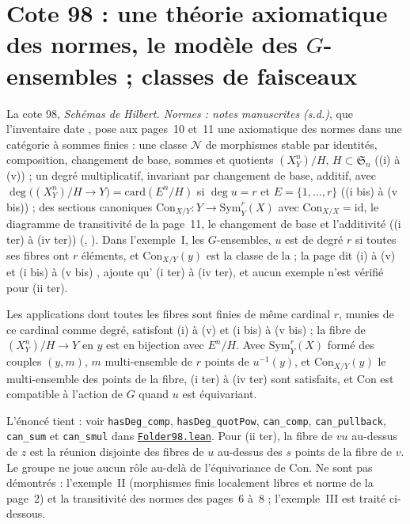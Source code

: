 \section[Cote 98 : une théorie axiomatique des normes, le modèle des G-ensembles ; classes de faisceaux]{Cote 98 : une théorie axiomatique des normes, le modèle des $G$-ensembles ; classes de faisceaux\protect{}}\label{sec:98}

La cote 98, \emph{Schémas de Hilbert. Normes : notes manuscrites (s.d.)}, que l'inventaire date \q{[à partir de 1966-1967]}, pose aux pages~10 et~11 une axiomatique des normes dans une catégorie à sommes finies : une classe $\mathcal N$ de morphismes stable par identités, composition, changement de base, sommes et quotients $(X^n_Y)/H$, $H \subset \mathfrak S_n$ ((i) à (v)) ; un degré multiplicatif, invariant par changement de base, additif, avec $\deg\bigl((X^n_Y)/H \to Y\bigr) = \mathrm{card}(E^n/H)$ si $\deg u = r$ et $E = \{1, \ldots, r\}$ ((i bis) à (v bis)) ; des sections canoniques $\mathrm{Con}_{X/Y} : Y \to \mathrm{Sym}^r_Y(X)$ avec $\mathrm{Con}_{X/X} = \mathrm{id}$, le diagramme de transitivité de la page~11, le changement de base et l'additivité ((i ter) à (iv ter)) (, ). Dans l'exemple~I, les $G$-ensembles, $u$ est de degré $r$ si toutes ses fibres ont $r$ éléments, et $\mathrm{Con}_{X/Y}(y)$ est la classe de la  ; la page dit (i) à (v) et (i bis) à (v bis) , ajoute qu' (i ter) à (iv ter), et aucun exemple n'est vérifié pour (ii ter).

\begin{encadre}
\begin{theoreme}
Les applications dont toutes les fibres sont finies de même cardinal $r$, munies de ce cardinal comme degré, satisfont (i) à (v) et (i bis) à (v bis) ; la fibre de $(X^n_Y)/H \to Y$ en $y$ est en bijection avec $E^n/H$. Avec $\mathrm{Sym}^r_Y(X)$ formé des couples $(y, m)$, $m$ multi-ensemble de $r$ points de $u^{-1}(y)$, et $\mathrm{Con}_{X/Y}(y)$ le multi-ensemble des points de la fibre, (i ter) à (iv ter) sont satisfaits, et $\mathrm{Con}$ est compatible à l'action de $G$ quand $u$ est équivariant.
\end{theoreme}
\end{encadre}

\noindent L'énoncé tient : voir \texttt{hasDeg\_comp}, \texttt{hasDeg\_quotPow}, \texttt{can\_comp}, \texttt{can\_pullback}, \texttt{can\_sum} et \texttt{can\_smul} dans \href{\leanblob/CategoryTheory/Folder98.lean}{\texttt{Folder98.\allowbreak{}lean}}. Pour (ii ter), la fibre de $vu$ au-dessus de $z$ est la réunion disjointe des fibres de $u$ au-dessus des $s$ points de la fibre de $v$. Le groupe ne joue aucun rôle au-delà de l'équivariance de $\mathrm{Con}$. Ne sont pas démontrés : l'exemple~II (morphismes finis localement libres et norme de la page~2) et la transitivité des normes des pages~6 à~8 ; l'exemple~III est traité ci-dessous.

